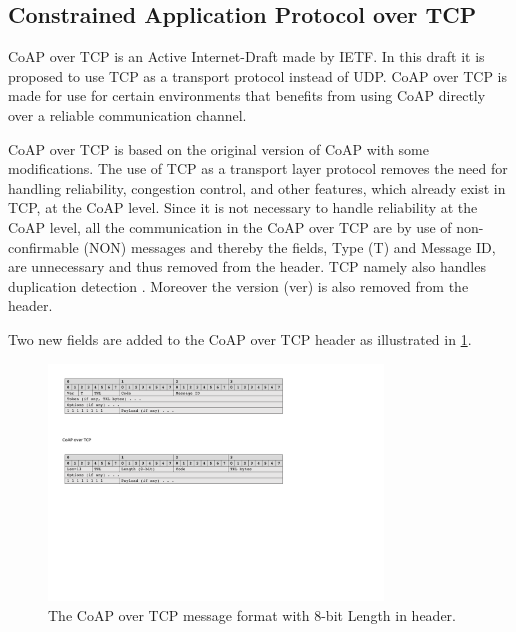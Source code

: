 


\subsection{Constrained Application Protocol over TCP}
CoAP over TCP is an Active Internet-Draft made by IETF. 
In this draft it is proposed to use TCP as a transport protocol instead of UDP.
CoAP over TCP is made for use for certain environments that benefits from using CoAP directly over a reliable communication channel.

CoAP over TCP is based on the original version of CoAP with some modifications. 
The use of TCP as a transport layer protocol removes the need for handling reliability, congestion control, and other features, which already exist in TCP, at the CoAP level.
Since it is not necessary to handle reliability at the CoAP level, all the communication in the CoAP over TCP are by use of non-confirmable (NON) messages and thereby the fields, Type (T) and Message ID, are unnecessary and thus removed from the header. 
TCP namely also handles duplication detection .
Moreover the version (ver) is also removed from the header.

Two new fields are added to the CoAP over TCP header as illustrated in \figurename{\ref{fig:msgformatcoapovertcp}}.
\begin{figure}[bht]
	\centering
	\includegraphics[width=3.5in]{gfx/msgformat-coapovertcp}
	\caption{The CoAP over TCP message format with 8-bit Length in header.}
	\label{fig:msgformatcoapovertcp}
\end{figure}

